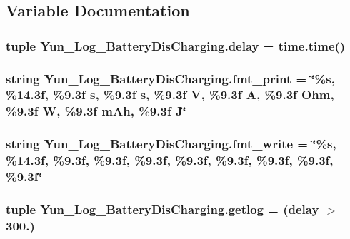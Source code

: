\subsection{Variable Documentation}
\hypertarget{namespaceYun__Log__BatteryDisCharging_a93560f3e3069eb2b837c46f1472b67d2}{
\subsubsection[{delay}]{\setlength{\rightskip}{0pt plus 5cm}tuple Yun\-\_\-\-Log\-\_\-\-Battery\-Dis\-Charging.\-delay = time.\-time()}}\label{namespaceYun__Log__BatteryDisCharging_a93560f3e3069eb2b837c46f1472b67d2}
\hypertarget{namespaceYun__Log__BatteryDisCharging_a9494efc17bebd5108d694922d40b4a31}{
\subsubsection[{fmt\-\_\-print}]{\setlength{\rightskip}{0pt plus 5cm}string Yun\-\_\-\-Log\-\_\-\-Battery\-Dis\-Charging.\-fmt\-\_\-print = \char`\"{}\%s, \%14.\-3f, \%9.\-3f s, \%9.\-3f s, \%9.\-3f V, \%9.\-3f A, \%9.\-3f Ohm, \%9.\-3f W, \%9.\-3f m\-Ah, \%9.\-3f J\char`\"{}}}\label{namespaceYun__Log__BatteryDisCharging_a9494efc17bebd5108d694922d40b4a31}
\hypertarget{namespaceYun__Log__BatteryDisCharging_a19bfe285d1481a648dd2a31df1ab7db6}{
\subsubsection[{fmt\-\_\-write}]{\setlength{\rightskip}{0pt plus 5cm}string Yun\-\_\-\-Log\-\_\-\-Battery\-Dis\-Charging.\-fmt\-\_\-write = \char`\"{}\%s, \%14.\-3f, \%9.\-3f, \%9.\-3f, \%9.\-3f, \%9.\-3f, \%9.\-3f, \%9.\-3f, \%9.\-3f, \%9.\-3f\char`\"{}}}\label{namespaceYun__Log__BatteryDisCharging_a19bfe285d1481a648dd2a31df1ab7db6}
\hypertarget{namespaceYun__Log__BatteryDisCharging_a1c9d6cfdb58049e1f92a6211fbbdee35}{
\subsubsection[{getlog}]{\setlength{\rightskip}{0pt plus 5cm}tuple Yun\-\_\-\-Log\-\_\-\-Battery\-Dis\-Charging.\-getlog = ({\bf delay} $>$ 300.)}}\label{namespaceYun__Log__BatteryDisCharging_a1c9d6cfdb58049e1f92a6211fbbdee35}
